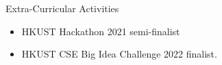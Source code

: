 \documentclass{resume} %
\begin{document}
\begin{rSection}{Extra-Curricular Activities}
    \begin{itemize}
        \item 	HKUST Hackathon 2021 semi-finalist
        \item	HKUST CSE Big Idea Challenge 2022 finalist.
    \end{itemize}


\end{rSection}




\end{document}

